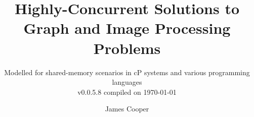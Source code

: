 \documentclass[11pt,partial]{aucklandthesis}
\theoremstyle{plain}
\begin{document}
%
%
%

\title{Highly-Concurrent Solutions to Graph and Image Processing Problems}
\subtitle{Modelled for shared-memory scenarios in cP systems and various programming languages \\ {\small v0.0.5.8 compiled on \today}}
\author{James Cooper}

\maketitle




\cleardoublepage\tableofcontents
\cleardoublepage\listoffigures
\cleardoublepage\listoftables
\cleardoublepage\listofcprulesetfloats
\cleardoublepage\listofcpobjectsfloats
\cleardoublepage\listoffixmes

%
%
%
%


\glsresetall

\glsresetall
% 

\glsresetall

\glsresetall

\glsresetall
\end{document}
